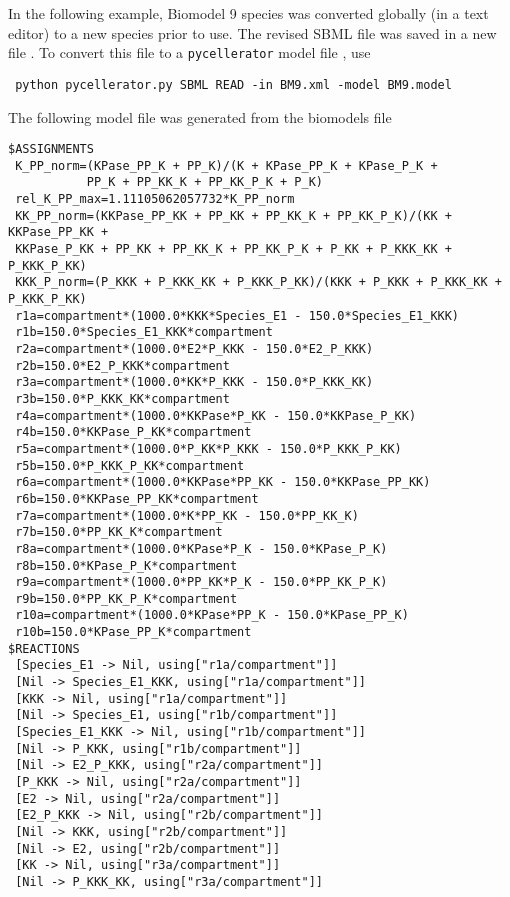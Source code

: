In the following example, Biomodel 9 species  was converted globally (in a text editor) to a new species  prior to use. The revised SBML file was saved in a new file . To convert this file to a {\tt pycellerator} model file , use


\begin{lstlisting}
 python pycellerator.py SBML READ -in BM9.xml -model BM9.model
\end{lstlisting}

The following model file was generated from the biomodels file
\begin{lstlisting}[xleftmargin=0in,xrightmargin=0in]
$ASSIGNMENTS
 K_PP_norm=(KPase_PP_K + PP_K)/(K + KPase_PP_K + KPase_P_K + 
           PP_K + PP_KK_K + PP_KK_P_K + P_K)
 rel_K_PP_max=1.11105062057732*K_PP_norm
 KK_PP_norm=(KKPase_PP_KK + PP_KK + PP_KK_K + PP_KK_P_K)/(KK + KKPase_PP_KK + 
 KKPase_P_KK + PP_KK + PP_KK_K + PP_KK_P_K + P_KK + P_KKK_KK + P_KKK_P_KK)
 KKK_P_norm=(P_KKK + P_KKK_KK + P_KKK_P_KK)/(KKK + P_KKK + P_KKK_KK + P_KKK_P_KK)
 r1a=compartment*(1000.0*KKK*Species_E1 - 150.0*Species_E1_KKK)
 r1b=150.0*Species_E1_KKK*compartment
 r2a=compartment*(1000.0*E2*P_KKK - 150.0*E2_P_KKK)
 r2b=150.0*E2_P_KKK*compartment
 r3a=compartment*(1000.0*KK*P_KKK - 150.0*P_KKK_KK)
 r3b=150.0*P_KKK_KK*compartment
 r4a=compartment*(1000.0*KKPase*P_KK - 150.0*KKPase_P_KK)
 r4b=150.0*KKPase_P_KK*compartment
 r5a=compartment*(1000.0*P_KK*P_KKK - 150.0*P_KKK_P_KK)
 r5b=150.0*P_KKK_P_KK*compartment
 r6a=compartment*(1000.0*KKPase*PP_KK - 150.0*KKPase_PP_KK)
 r6b=150.0*KKPase_PP_KK*compartment
 r7a=compartment*(1000.0*K*PP_KK - 150.0*PP_KK_K)
 r7b=150.0*PP_KK_K*compartment
 r8a=compartment*(1000.0*KPase*P_K - 150.0*KPase_P_K)
 r8b=150.0*KPase_P_K*compartment
 r9a=compartment*(1000.0*PP_KK*P_K - 150.0*PP_KK_P_K)
 r9b=150.0*PP_KK_P_K*compartment
 r10a=compartment*(1000.0*KPase*PP_K - 150.0*KPase_PP_K)
 r10b=150.0*KPase_PP_K*compartment
$REACTIONS
 [Species_E1 -> Nil, using["r1a/compartment"]]
 [Nil -> Species_E1_KKK, using["r1a/compartment"]]
 [KKK -> Nil, using["r1a/compartment"]]
 [Nil -> Species_E1, using["r1b/compartment"]]
 [Species_E1_KKK -> Nil, using["r1b/compartment"]]
 [Nil -> P_KKK, using["r1b/compartment"]]
 [Nil -> E2_P_KKK, using["r2a/compartment"]]
 [P_KKK -> Nil, using["r2a/compartment"]]
 [E2 -> Nil, using["r2a/compartment"]]
 [E2_P_KKK -> Nil, using["r2b/compartment"]]
 [Nil -> KKK, using["r2b/compartment"]]
 [Nil -> E2, using["r2b/compartment"]]
 [KK -> Nil, using["r3a/compartment"]]
 [Nil -> P_KKK_KK, using["r3a/compartment"]]

\end{lstlisting}
